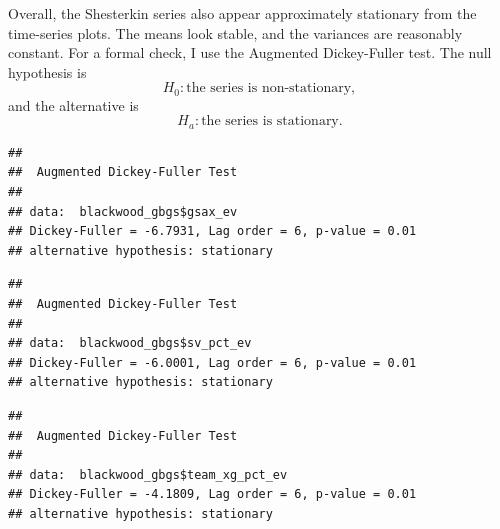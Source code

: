 \documentclass[
  10pt,
]{extarticle}
\newenvironment{Shaded}{\begin{snugshade}}{\end{snugshade}}
\newcommand{\FunctionTok}[1]{\textcolor[rgb]{0.13,0.29,0.53}{\textbf{#1}}}
\newcommand{\NormalTok}[1]{#1}
\newcommand{\SpecialCharTok}[1]{\textcolor[rgb]{0.81,0.36,0.00}{\textbf{#1}}}
\begin{document}
Overall, the Shesterkin series also appear approximately stationary from the time-series plots. The means look stable, and the variances are reasonably constant. For a formal check, I use the Augmented Dickey-Fuller test. The null hypothesis is
\[
H_0: \text{the series is non-stationary},
\]
and the alternative is
\[
H_a: \text{the series is stationary}.
\]

\begin{Shaded}
\end{Shaded}

\begin{verbatim}
## 
##  Augmented Dickey-Fuller Test
## 
## data:  blackwood_gbgs$gsax_ev
## Dickey-Fuller = -6.7931, Lag order = 6, p-value = 0.01
## alternative hypothesis: stationary
\end{verbatim}

\begin{Shaded}
\end{Shaded}

\begin{verbatim}
## 
##  Augmented Dickey-Fuller Test
## 
## data:  blackwood_gbgs$sv_pct_ev
## Dickey-Fuller = -6.0001, Lag order = 6, p-value = 0.01
## alternative hypothesis: stationary
\end{verbatim}

\begin{Shaded}
\end{Shaded}

\begin{verbatim}
## 
##  Augmented Dickey-Fuller Test
## 
## data:  blackwood_gbgs$team_xg_pct_ev
## Dickey-Fuller = -4.1809, Lag order = 6, p-value = 0.01
## alternative hypothesis: stationary
\end{verbatim}

\begin{Shaded}
\end{Shaded}
\end{document}
